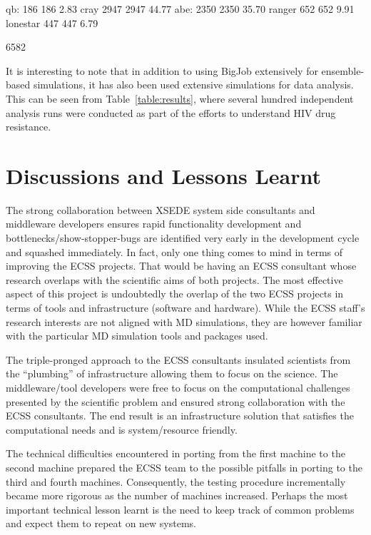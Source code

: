 \documentclass{sig-alternate}
\begin{document}
qb: 186	186	2.83%
cray 2947	2947	44.77%
abe: 2350	2350	35.70%
ranger 652	652	9.91%
lonestar 447	447	6.79%

6582	




It is interesting to note that in addition to using BigJob extensively
for ensemble-based simulations, it has also been used extensive
simulations for data analysis. This can be seen from
Table~\ref{table:results}, where several hundred independent analysis runs were
conducted as part of the efforts to understand HIV drug resistance.


\section{Discussions and Lessons Learnt}


The strong collaboration between XSEDE system side consultants
and middleware developers ensures rapid functionality
development and bottlenecks/show-stopper-bugs are identified very
early in the development cycle and squashed immediately. In fact, only
one thing comes to mind in terms of improving the ECSS projects. That
would be having an ECSS consultant whose research overlaps with the
scientific aims of both projects. The most effective aspect of this
project is undoubtedly the overlap of the two ECSS projects in terms
of tools and infrastructure (software and hardware). While the ECSS
staff's research interests are not aligned with MD simulations, they
are however familiar with the particular MD simulation tools and
packages used.

The triple-pronged approach to the ECSS consultants insulated scientists from
the ``plumbing'' of infrastructure allowing them to focus on the science. The
middleware/tool developers were free to focus on the computational challenges
presented by the scientific problem and ensured strong collaboration with the
ECSS consultants. The end result is an infrastructure solution that satisfies
the computational needs and is system/resource friendly.

The technical difficulties encountered in porting from the first
machine to the second machine prepared the ECSS team to the possible
pitfalls in porting to the third and fourth machines. Consequently,
the testing procedure incrementally became more rigorous as the number
of machines increased. Perhaps the most important technical lesson
learnt is the need to keep track of common problems and expect them to
repeat on new systems.
\end{document}
